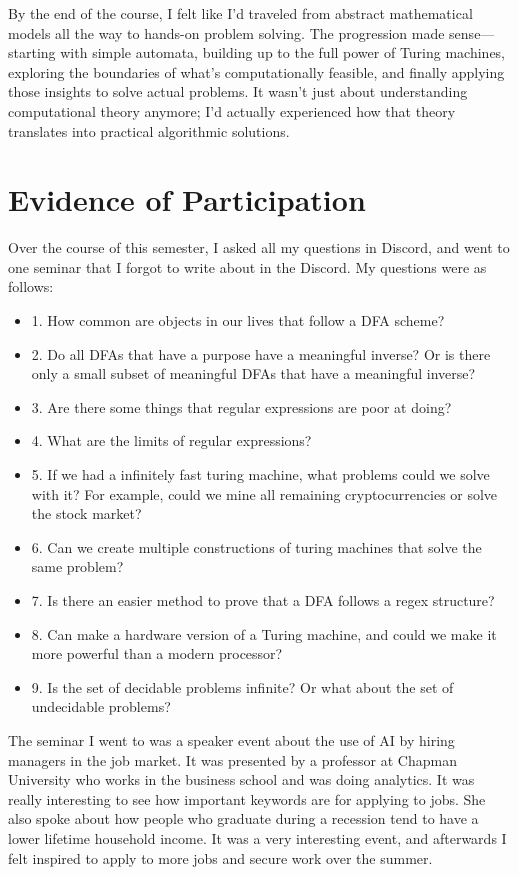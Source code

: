 \documentclass{article}
\theoremstyle{theorem}
\theoremstyle{definition}
\theoremstyle{remark}
\begin{document}
By the end of the course, I felt like I'd traveled from abstract mathematical models all the way to hands-on problem solving. The progression made sense—starting with simple automata, building up to the full power of Turing machines, exploring the boundaries of what's computationally feasible, and finally applying those insights to solve actual problems. It wasn't just about understanding computational theory anymore; I'd actually experienced how that theory translates into practical algorithmic solutions.

\section{Evidence of Participation}
Over the course of this semester, I asked all my questions in Discord, and went to one seminar that I forgot to write about in the Discord. My questions were as follows:

\begin{itemize}
    \item 1. How common are objects in our lives that follow a DFA scheme?
    \item 2. Do all DFAs that have a purpose have a meaningful inverse? Or is there only a small subset of meaningful DFAs that have a meaningful inverse?
    \item 3. Are there some things that regular expressions are poor at doing? 
    \item 4. What are the limits of regular expressions?
    \item 5. If we had a infinitely fast turing machine, what problems could we solve with it? For example, could we mine all remaining cryptocurrencies or solve the stock market?
    \item 6. Can we create multiple constructions of turing machines that solve the same problem? 
    \item 7. Is there an easier method to prove that a DFA follows a regex structure? 
    \item 8. Can make a hardware version of a Turing machine, and could we make it more powerful than a modern processor? 
    \item 9. Is the set of decidable problems infinite? Or what about the set of undecidable problems?
\end{itemize}

The seminar I went to was a speaker event about the use of AI by hiring managers in the job market. It was presented by a professor at Chapman University who works in the business school and was doing analytics. It was really interesting to see how important keywords are for applying to jobs. She also spoke about how people who graduate during a recession tend to have a lower lifetime household income. It was a very interesting event, and afterwards I felt inspired to apply to more jobs and secure work over the summer.
\end{document}
